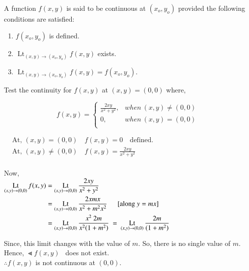 \documentclass[12pt]{article}
\renewcommand{\lim}{\operatorname*{Lt}}
\begin{document}

A function $f(x,y)$ is said to be continuous at $(x_o, y_o)$ provided the following conditions are satisfied:

\vspace{-0.5\baselineskip}
\begin{enumerate}
   \item $f(x_o, y_o)$ is defined.
   \item $\lim_{(x,y) \to (x_o, y_o)} f(x, y)$ exists.
   \item $\lim_{(x,y) \to (x_o, y_o)} f(x, y) = f(x_o, y_o)$.
\end{enumerate}

\vspace{1ex}
\textbf{} Test the continuity for $f(x,y)$ at $(x,y)=(0,0)$ where,

\vspace{-0.5\baselineskip}
\begin{equation*}
   f(x,y) =
   \begin{cases}
      \frac{2xy}{x^2+y^2}, & when \ (x,y) \neq (0,0)\\
           0, & when \ (x,y) = (0,0)\\
   \end{cases}
\end{equation*}

\vspace{-\baselineskip}

\vspace{1ex}
$\begin{aligned}
   &\text{At,\ } (x,y) = (0,0) \quad f(x,y)=0 \quad \text{defined.}\\
   &\text{At,\ } (x,y) \neq (0,0) \quad f(x,y)=\frac{2xy}{x^2+y^2}\\
\end{aligned}$

\vspace{2ex}
Now,\\
$\begin{aligned}
   \Lt f(x, y) & = \Lt \frac{2xy}{x^2+y^2} \\
   & = \Lt \frac{2xmx}{x^2+m^2x^2} \tabs [\text{along } y=mx] \\
   & = \Lt \frac{x^2\ 2m}{x^2(1+m^2)} \ = \ \Lt \frac{2m}{(1+m^2)}  \\
\end{aligned}$

\vspace{3ex}
Since, this limit changes with the value of $m$. So, there is no single value of $m$.\\
Hence, $\Lt f(x, y)$ \ does not exist.\\
$\therefore f(x,y)$ is not continuous at $(0,0)$.
\end{document}
